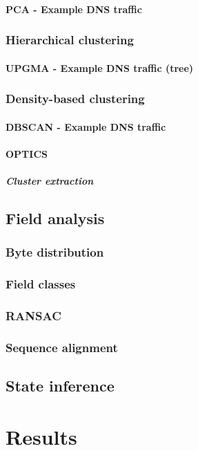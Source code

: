 \documentclass[a4paper]{report}
\begin{document}
\subsubsection{PCA - Example DNS traffic}
\subsection{Hierarchical clustering}
\subsubsection{UPGMA - Example DNS traffic (tree)}
\subsection{Density-based clustering}
\subsubsection{DBSCAN - Example DNS traffic}
\subsubsection{OPTICS}
\paragraph{Cluster extraction}
\section{Field analysis}
\subsection{Byte distribution}
\subsection{Field classes}
\subsection{RANSAC}
\subsection{Sequence alignment}
\section{State inference}
\chapter{Results}
\end{document}
